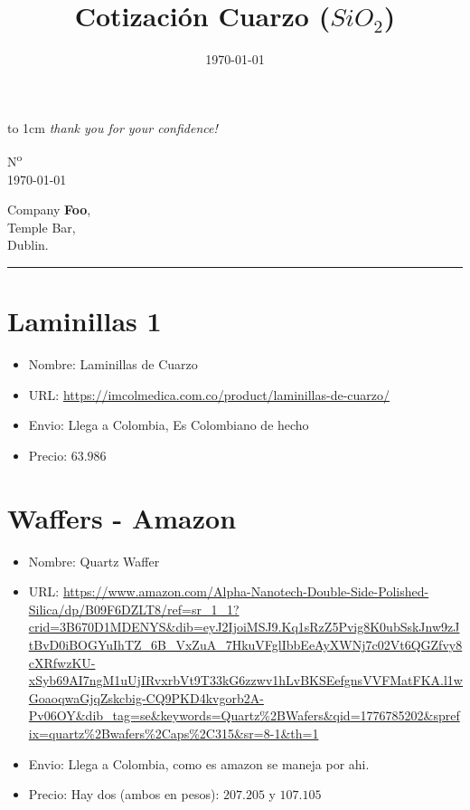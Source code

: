\documentclass[a4paper]{article}
\title{Cotización Cuarzo ($SiO_2$)}
\date{\today}
\makeatletter
\let\displayFont\relax
\let\thetitle\@title
\makeatother
\begin{document}
\parbox[b][2cm][t]{\rightalignment}{{\color{gray!95}\displayFont\fontsize{1.5cm}{1.5cm}\selectfont %
\vbox to 1cm{\vss %
%
\companyname{}%
%
}}
\vskip 3mm%
{\fontsize{0.44cm}{0.5cm}%
\emph{thank you for your confidence!}%
}
}%
%
\parbox[b][2cm][t]{0.35\textwidth}{}

\kern -5mm

\leavevmode\kern \rightalignment \parbox{0.35\textwidth}{\ttfamily N\textsuperscript{o} \invoicenum\\
\today }

\vskip 0.7cm

\leavevmode\kern \rightalignment\kern -3mm \colorbox{gray!85}{
  \kern 1mm\begin{minipage}[t]{0.5\textwidth}
    \color{white}
    \vskip 2mm
    Company \textbf{Foo},\\
    Temple Bar,\\
    Dublin.\\
    \vspace*{-3mm}%
  \end{minipage}
}

\vskip 2.3cm

\begin{center}
{\ttfamily\LARGE \thetitle}

\rule{2cm}{0.25pt}
\end{center}

\section{Laminillas 1}
\begin{itemize}
  \item Nombre: Laminillas de Cuarzo
  \item URL: \url{https://imcolmedica.com.co/product/laminillas-de-cuarzo/}
  \item Envio: Llega a Colombia, Es Colombiano de hecho
  \item Precio: $63.986$
\end{itemize}

\section{Waffers - Amazon}
\begin{itemize}
  \item Nombre: Quartz Waffer
  \item URL: \url{https://www.amazon.com/Alpha-Nanotech-Double-Side-Polished-Silica/dp/B09F6DZLT8/ref=sr_1_1?crid=3B670D1MDENYS&dib=eyJ2IjoiMSJ9.Kq1sRzZ5Pvig8K0ubSskJnw9zJtBvD0iBOGYuIhTZ_6B_VxZuA_7HkuVFglIbbEeAyXWNj7c02Vt6QGZfvy8cXRfwzKU-xSyb69AI7ngM1uUjIRvxrbVt9T33kG6zzwv1hLvBKSEefgnsVVFMatFKA.l1wGoaoqwaGjqZskcbig-CQ9PKD4kvgorb2A-Pv06OY&dib_tag=se&keywords=Quartz\%2BWafers&qid=1776785202&sprefix=quartz\%2Bwafers\%2Caps\%2C315&sr=8-1&th=1}
  \item Envio: Llega a Colombia, como es amazon se maneja por ahi.
  \item Precio: Hay dos (ambos en pesos): $207.205$ y $107.105$
\end{itemize}
\end{document}

